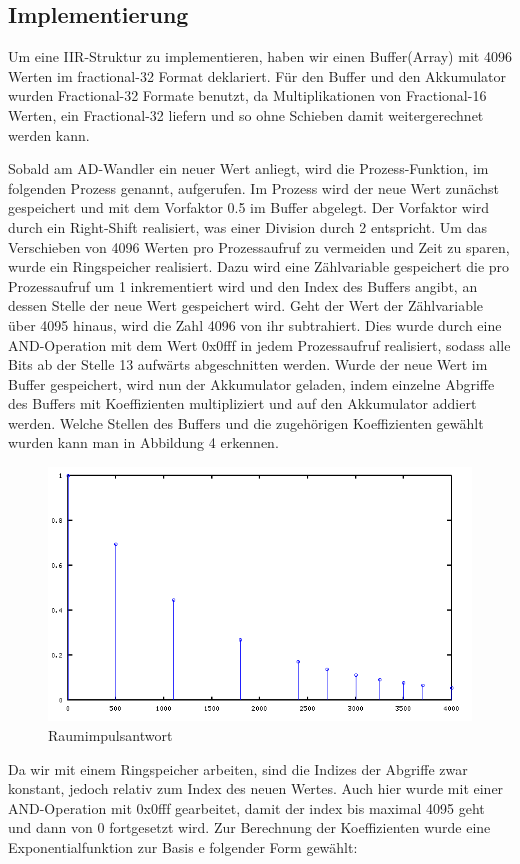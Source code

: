 \documentclass[a4paper,12pt,fontsize=12,DIV=12]{scrartcl}
\begin{document}
\subsection{Implementierung}
Um eine IIR-Struktur zu implementieren, haben wir einen Buffer(Array) mit 4096 Werten im fractional-32 Format deklariert. Für den Buffer und den Akkumulator wurden Fractional-32 Formate benutzt, da Multiplikationen von Fractional-16 Werten, ein Fractional-32 liefern und so ohne Schieben damit weitergerechnet werden kann.

Sobald am AD-Wandler ein neuer Wert anliegt, wird die Prozess-Funktion, im folgenden Prozess genannt, aufgerufen. Im Prozess wird der neue Wert zunächst gespeichert und mit dem Vorfaktor 0.5 im Buffer abgelegt. Der Vorfaktor wird durch ein Right-Shift realisiert, was einer Division durch 2 entspricht. 
Um das Verschieben von 4096 Werten pro Prozessaufruf zu vermeiden und Zeit zu sparen, wurde ein Ringspeicher realisiert. Dazu wird eine Zählvariable gespeichert die pro Prozessaufruf um 1 inkrementiert wird und den Index des Buffers angibt, an dessen Stelle der neue Wert gespeichert wird. Geht der Wert der Zählvariable über 4095 hinaus, wird die Zahl 4096 von ihr subtrahiert. Dies wurde durch eine AND-Operation mit dem Wert 0x0fff in jedem Prozessaufruf realisiert, sodass alle Bits ab der Stelle 13  aufwärts abgeschnitten werden.
Wurde der neue Wert im Buffer gespeichert, wird nun der Akkumulator geladen, indem einzelne Abgriffe des Buffers mit Koeffizienten multipliziert und auf den Akkumulator addiert werden. Welche Stellen des Buffers und die zugehörigen Koeffizienten gewählt wurden kann man in Abbildung 4 erkennen.
\begin{figure}[h]
	\includegraphics[scale=0.5]{Bilder/signalabgriffe.png}
	\caption{Raumimpulsantwort}
	\label{labelname}
\end{figure}
Da wir mit einem Ringspeicher arbeiten, sind die Indizes der Abgriffe zwar konstant, jedoch relativ zum Index des neuen Wertes. Auch hier wurde mit einer AND-Operation mit 0x0fff gearbeitet, damit der index bis maximal 4095 geht und dann von 0 fortgesetzt wird.
Zur Berechnung der Koeffizienten wurde eine Exponentialfunktion zur Basis e folgender Form gewählt:
\end{document}
